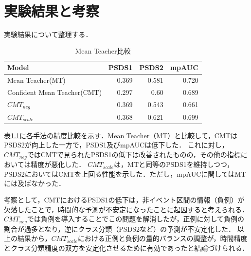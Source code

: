 \documentclass[main]{subfiles}
\begin{document}
\chapter{実験結果と考察}
 実験結果について整理する．

\begin{table}[htbp]
 \begin{center}
   \begin{tabular}{|l|r|r|r|}
    \hline
    Model                       & PSDS1 & PSDS2 & mpAUC \\
    \hline
    Mean Teacher(MT)            & 0.369 & 0.581 & 0.720 \\
    Confident Mean Teacher(CMT) & 0.297 & 0.60  & 0.689 \\
    $CMT_{neg}$                     & 0.369 & 0.543 & 0.661 \\
    $CMT_{scale}$                 & 0.368 & 0.621 & 0.699 \\
    \hline
  \end{tabular}
   \caption{Mean Teacher比較}
   \label{table:mtAcc}
\end{center}
\end{table}

表\ref{table:mtAcc}に各手法の精度比較を示す．Mean Teacher（MT）と比較して，CMTはPSDS2が向上した一方で，PSDS1及びmpAUCは低下した．
これに対し，$CMT_{neg}$ではCMTで見られたPSDS1の低下は改善されたものの，その他の指標においては精度が悪化した．
$CMT_{scale}$は，MTと同等のPSDS1を維持しつつ，PSDS2においてはCMTを上回る性能を示した．ただし，mpAUCに関してはMTには及ばなかった．\par

考察として，CMTにおけるPSDS1の低下は，非イベント区間の情報（負例）が欠落したことで，時間的な予測が不安定になったことに起因すると考えられる．
$CMT_{neg}$では負例を導入することでこの問題を解消したが，正例に対して負例の割合が過多となり，逆にクラス分類（PSDS2など）の予測が不安定化した．
以上の結果から，$CMT_{scale}$における正例と負例の量的バランスの調整が，時間精度とクラス分類精度の双方を安定化させるために有効であったと結論づけられる．\par
\end{document}
